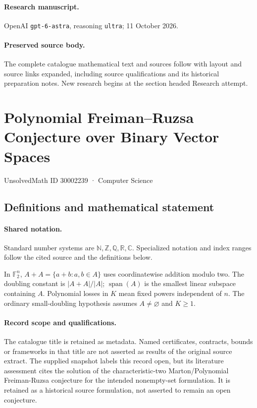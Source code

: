 \documentclass[11pt]{article}
\begin{document}
\paragraph{Research manuscript.} OpenAI \texttt{gpt-6-astra}, reasoning \texttt{ultra}; 11 October 2026.
\paragraph{Preserved source body.} The complete catalogue mathematical text and sources follow with layout and source links expanded, including source qualifications and its historical preparation notes. New research begins at the section headed Research attempt.

\section{Polynomial Freiman–Ruzsa Conjecture over Binary Vector Spaces}\label{30002239}
{\small UnsolvedMath ID 30002239 · Computer Science}
\subsection{Definitions and mathematical statement}

\paragraph{Shared notation.}Standard number systems are $\mathbb N,\mathbb Z,\mathbb Q,\mathbb R,\mathbb C$. Specialized notation and index ranges follow the cited source and the definitions below.


In $\mathbb F_2^n$, $A+A=\{a+b:a,b\in A\}$ uses coordinatewise addition modulo two. The doubling constant is $|A+A|/|A|$; $\operatorname{span}(A)$ is the smallest linear subspace containing $A$. Polynomial losses in $K$ mean fixed powers independent of $n$. The ordinary small-doubling hypothesis assumes $A\ne\varnothing$ and $K\ge1$.
\paragraph{Record scope and qualifications.}
The catalogue title is retained as metadata. Named certificates, contracts, bounds or frameworks in that title are not asserted as results of the original source extract.
The supplied snapshot labels this record open, but its literature assessment cites the solution of the characteristic-two Marton/Polynomial Freiman-Ruzsa conjecture for the intended nonempty-set formulation. It is retained as a historical source formulation, not asserted to remain an open conjecture.
\end{document}
